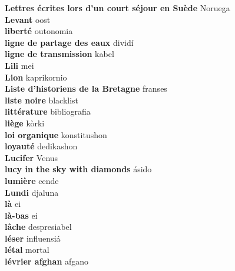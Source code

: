 \textbf{ Lettres écrites lors d’un court séjour en Suède  } Noruega \\
\textbf{ Levant  } oost \\
\textbf{ liberté  } outonomia \\
\textbf{ ligne de partage des eaux  } dividí \\
\textbf{ ligne de transmission  } kabel \\
\textbf{ Lili  } mei \\
\textbf{ Lion  } kaprikornio \\
\textbf{ Liste d’historiens de la Bretagne  } franses \\
\textbf{ liste noire  } blacklist \\
\textbf{ littérature  } bibliografia \\
\textbf{ liège  } kòrki \\
\textbf{ loi organique  } konstitushon \\
\textbf{ loyauté  } dedikashon \\
\textbf{ Lucifer  } Venus \\
\textbf{ lucy in the sky with diamonds  } ásido \\
\textbf{ lumière  } cende \\
\textbf{ Lundi  } djaluna \\
\textbf{ là  } ei \\
\textbf{ là-bas  } ei \\
\textbf{ lâche  } despresiabel \\
\textbf{ léser  } influensiá \\
\textbf{ létal  } mortal \\
\textbf{ lévrier afghan  } afgano \\
